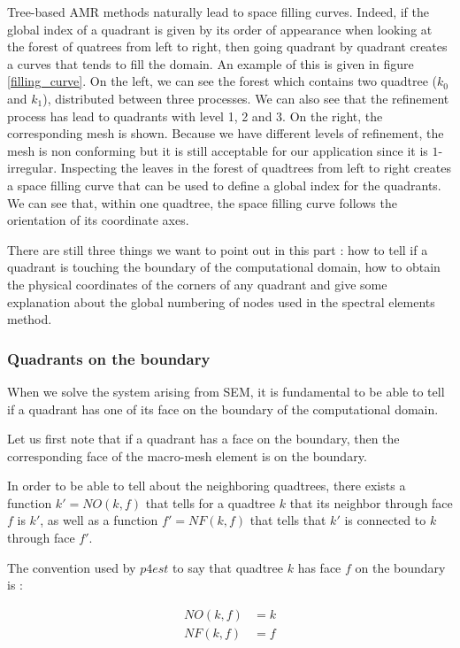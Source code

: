 Tree-based AMR methods naturally lead to space filling curves. Indeed, if the global index of a quadrant is given by its order of appearance when looking at the forest of quatrees from left to right, then going quadrant by quadrant creates a curves that tends to fill the domain. An example of this is given in figure \ref{filling_curve}. On the left, we can see the forest which contains two quadtree ($k_0$ and $k_1$), distributed between three processes. We can also see that the refinement process has lead to quadrants with level 1, 2 and 3. On the right, the corresponding mesh is shown. Because we have different levels of refinement, the mesh is non conforming but it is still acceptable for our application since it is $1$-irregular. Inspecting the leaves in the forest of quadtrees from left to right creates a space filling curve that can be used to define a global index for the quadrants. We can see that, within one quadtree, the space filling curve follows the orientation of its coordinate axes.

There are still three things we want to point out in this part : how to tell if a quadrant is touching the boundary of the computational domain, how to obtain the physical coordinates of the corners of any quadrant and give some explanation about the global numbering of nodes used in the spectral elements method. 

\subsubsection{Quadrants on the boundary}

When we solve the system arising from SEM, it is fundamental to be able to tell if a quadrant has one of its face on the boundary of the computational domain. 

Let us first note that if a quadrant has a face on the boundary, then the corresponding face of the macro-mesh element is on the boundary. 

In order to be able to tell about the neighboring quadtrees, there exists a function $k'=NO(k,f)$ that tells for a quadtree $k$ that its neighbor through face $f$ is $k'$, as well as a function $f' = NF(k,f)$ that tells that $k'$ is connected to $k$ through face $f'$. 

The convention used by $p4est$ to say that quadtree $k$ has face $f$ on the boundary is : 

\begin{align*}
NO(k,f) &= k\\
NF(k,f) &= f
\end{align*}

